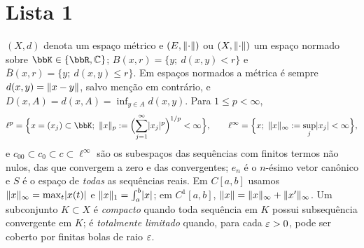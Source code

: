 \section{Lista 1}
\renewcommand{\currentlista}{1}
\setcounter{exq}{0}

\begin{tcolorbox}[
  enhanced,
  breakable,
  colback=mytheorembg,
  colframe=doc!80!black,
  boxrule=0sp,
  borderline west={2.5pt}{0pt}{doc!80!black},
  sharp corners,
  title=\textbf{Notação e Convenções},
  coltitle=doc!80!black,
  fonttitle=\bfseries\sffamily,
  detach title,
  before upper=\tcbtitle\par\smallskip
]
$(X,d)$ denota um espaço métrico e $(E,\lVert\cdot\rVert)$ ou $(X,\lVert\cdot\rVert)$ um espaço normado sobre $\bbK\in\{\R,\mathbb{C}\}$; $B(x,r)=\{y;\ d(x,y)<r\}$ e $\overline{B}(x,r)=\{y;\ d(x,y)\le r\}$. Em espaços normados a métrica é sempre $d(x,y)=\lVert x-y\rVert$, salvo menção em contrário, e $D(x,A)=d(x,A)=\inf_{y\in A}d(x,y)$. Para $1\le p<\infty$,
\[ \ell^p=\Bigl\{x=(x_j)\subset\bbK;\ \norm{x}_p:=\Bigl(\sum_{j=1}^\infty\abs{x_j}^p\Bigr)^{1/p}<\infty\Bigr\},\qquad \ell^\infty=\Bigl\{x;\ \norm{x}_\infty:=\sup_j\abs{x_j}<\infty\Bigr\}, \]
e $c_{00}\subset c_0\subset c\subset\ell^\infty$ são os subespaços das sequências com finitos termos não nulos, das que convergem a zero e das convergentes; $e_n$ é o $n$-ésimo vetor canônico e $S$ é o espaço de \emph{todas} as sequências reais. Em $C[a,b]$ usamos $\lVert x\rVert_\infty=\max_t\lvert x(t)\rvert$ e $\lVert x\rVert_1=\int_a^b\lvert x\rvert$; em $C^1[a,b]$, $\lVert x\rVert=\lVert x\rVert_\infty+\lVert x'\rVert_\infty$. Um subconjunto $K\subset X$ é \emph{compacto} quando toda sequência em $K$ possui subsequência convergente em $K$; é \emph{totalmente limitado} quando, para cada $\varepsilon>0$, pode ser coberto por finitas bolas de raio $\varepsilon$.
\end{tcolorbox}

